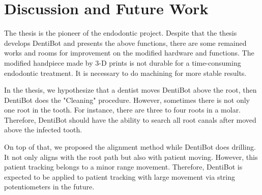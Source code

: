 \section{Discussion and Future Work}
\hspace*{6mm}The thesis is the pioneer of the endodontic project. Despite that the thesis develops DentiBot and presents the above functions, there are some remained works and rooms for improvement on the modified hardware and functions. The modified handpiece made by 3-D prints is not durable for a time-consuming endodontic treatment. It is necessary to do machining for more stable results. 
\par 
In the thesis, we hypothesize that a dentist moves DentiBot above the root, then DentiBot does the "Cleaning" procedure. However, sometimes there is not only one root in the tooth. For instance, there are three to four roots in a molar. Therefore, DentiBot should have the ability to search all root canals after moved above the infected tooth. 
\par
On top of that, we proposed the alignment method while DentiBot does drilling. It not only aligns with the root path but also with patient moving. However, this patient tracking belongs to a minor range movement. Therefore, DentiBot is expected to be applied to patient tracking with large movement via string potentiometers in the future.			